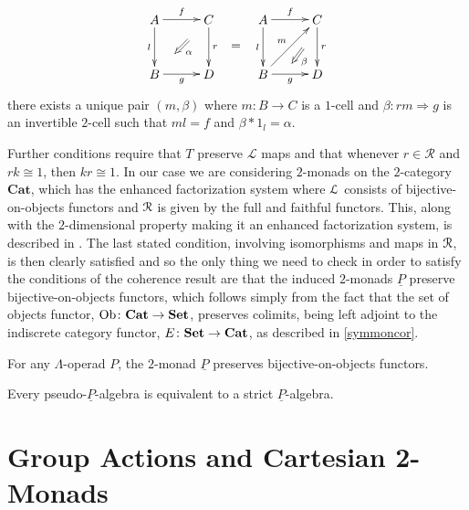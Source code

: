     \[
        \xy
            (0,0)*+{A}="00";
            (15,0)*+{C}="10";
            (0,-15)*+{B}="01";
            (15,-15)*+{D}="11";
            {\ar^{f} "00" ; "10"};
            {\ar^{r} "10" ; "11"};
            {\ar_{l} "00" ; "01"};
            {\ar_{g} "01" ; "11"};
            {\ar@{=>}^{\alpha} (9.375,-5.625) ; (5.625,-9.375)};
            (22.5,-7.5)*+{=};
            (30,0)*+{A}="20";
            (45,0)*+{C}="30";
            (30,-15)*+{B}="21";
            (45,-15)*+{D}="31";
            {\ar^{f} "20" ; "30"};
            {\ar^{r} "30" ; "31"};
            {\ar_{l} "20" ; "21"};
            {\ar_{g} "21" ; "31"};
            {\ar^{m} "21" ; "30"};
            {\ar@{=>}^{\beta} (41,-8) ; (38,-12)};
        \endxy
    \]
there exists a unique pair $(m,\beta)$ where $m \colon B \rightarrow C$ is a $1$-cell and $\beta \colon rm \Rightarrow g$ is an invertible $2$-cell such that $ml = f$ and $\beta \ast 1_{l} = \alpha$.

Further conditions require that $T$ preserve $\mathcal{L}$ maps and that whenever $r \in \mathcal{R}$ and $rk \cong 1$, then $kr \cong 1$. In our case we are considering $2$-monads on the $2$-category $\mathbf{Cat}$, which has the enhanced factorization system where $\mathcal{L}$ consists of bijective-on-objects functors and $\mathcal{R}$ is given by the full and faithful functors. This, along with the $2$-dimensional property making it an enhanced factorization system, is described in \cite{power-gen}. The last stated condition, involving isomorphisms and maps in $\mathcal{R}$, is then clearly satisfied and so the only thing we need to check in order to satisfy the conditions of the coherence result are that the induced $2$-monads $\underline{P}$ preserve bijective-on-objects functors, which follows simply from the fact that the set of objects functor, $\operatorname{Ob} \colon \mathbf{Cat} \rightarrow \mathbf{Set}$, preserves colimits, being left adjoint to the indiscrete category functor, $E \colon \mathbf{Set} \rightarrow \mathbf{Cat}$, as described in \cref{symmoncor}.

\begin{prop}
For any $\Lambda$-operad $P$, the $2$-monad $\underline{P}$ preserves bijective-on-objects functors.
\end{prop}
\begin{cor}
Every pseudo-$\underline{P}$-algebra is equivalent to a strict $\underline{P}$-algebra.
\end{cor}



\section{Group Actions and Cartesian 2-Monads}

